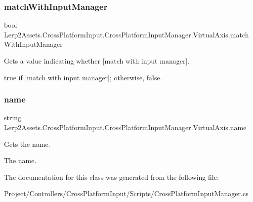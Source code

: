 \subsubsection{\texorpdfstring{match\+With\+Input\+Manager}{matchWithInputManager}}
{\footnotesize\ttfamily bool Lerp2\+Assets.\+Cross\+Platform\+Input.\+Cross\+Platform\+Input\+Manager.\+Virtual\+Axis.\+match\+With\+Input\+Manager\hspace{0.3cm}{\ttfamily [get]}}



Gets a value indicating whether \mbox{[}match with input manager\mbox{]}. 

{\ttfamily true} if \mbox{[}match with input manager\mbox{]}; otherwise, {\ttfamily false}.\mbox{\label{class_lerp2_assets_1_1_cross_platform_input_1_1_cross_platform_input_manager_1_1_virtual_axis_afe53ae5555c8ef0901ae2fca3a3da6f0}} 
\subsubsection{\texorpdfstring{name}{name}}
{\footnotesize\ttfamily string Lerp2\+Assets.\+Cross\+Platform\+Input.\+Cross\+Platform\+Input\+Manager.\+Virtual\+Axis.\+name\hspace{0.3cm}{\ttfamily [get]}}



Gets the name. 

The name.

The documentation for this class was generated from the following file\+:\begin{DoxyCompactItemize}
\item 
Project/\+Controllers/\+Cross\+Platform\+Input/\+Scripts/Cross\+Platform\+Input\+Manager.\+cs\end{DoxyCompactItemize}
